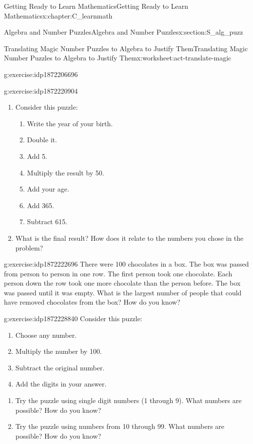\documentclass[oneside,10pt,]{book}
\numberwithin{equation}{chapter}
\begin{document}
\begin{chapterptx}{Getting Ready to Learn Mathematics}{}{Getting Ready to Learn Mathematics}{}{}{x:chapter:C_learnmath}
\begin{sectionptx}{Algebra and Number Puzzles}{}{Algebra and Number Puzzles}{}{}{x:section:S_alg_puzz}
\begin{worksheet-subsection}{Translating Magic Number Puzzles to Algebra to Justify Them}{}{Translating Magic Number Puzzles to Algebra to Justify Them}{}{}{x:worksheet:act-translate-magic}
\begin{divisionexercise}{3}{}{}{g:exercise:idp1872206696}
\end{divisionexercise}%
\begin{divisionexercise}{4}{}{}{g:exercise:idp1872220904}%
\begin{enumerate}[font=\bfseries,label=(\alph*),ref=\alph*]
\item{}Consider this puzzle:%
\begin{enumerate}[label=(\alph*)]
\item{}Write the year of your birth.%
\item{}Double it.%
\item{}Add 5.%
\item{}Multiply the result by 50.%
\item{}Add your age.%
\item{}Add 365.%
\item{}Subtract 615.%
\end{enumerate}
%
\item{}What is the final result? How does it relate to the numbers you chose in the problem?%
\end{enumerate}
\end{divisionexercise}%
\begin{divisionexercise}{5}{}{}{g:exercise:idp1872222696}%
There were 100 chocolates in a box. The box was passed from person to person in one row. The first person took one chocolate. Each person down the row took one more chocolate than the person before. The box was passed until it was empty. What is the largest number of people that could have removed chocolates from the box? How do you know?%
\end{divisionexercise}%
\begin{divisionexercise}{6}{}{}{g:exercise:idp1872228840}%
Consider this puzzle:%
\begin{enumerate}[label=(\alph*)]
\item{}Choose any number.%
\item{}Multiply the number by 100.%
\item{}Subtract the original number.%
\item{}Add the digits in your answer.%
\end{enumerate}
%
\begin{enumerate}[font=\bfseries,label=(\alph*),ref=\alph*]
\item{}Try the puzzle using single digit numbers (1 through 9). What numbers are possible? How do you know?%
\item{}Try the puzzle using numbers from 10 through 99. What numbers are possible? How do you know?%

\end{enumerate}
\end{divisionexercise}
\end{worksheet-subsection}
\end{sectionptx}
\end{chapterptx}
\end{document}
